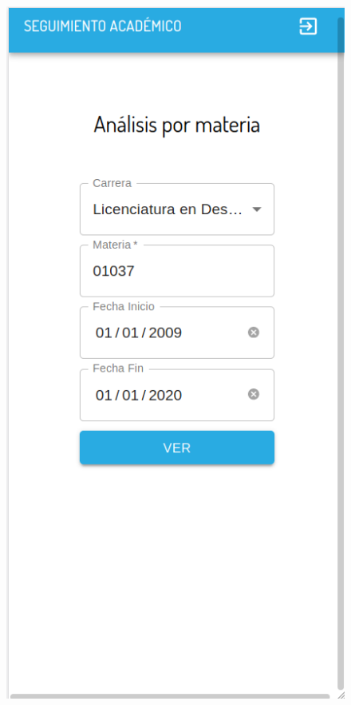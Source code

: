 \begin{figure}[!htbp]
  \centering
    \includegraphics[scale=0.3]{images/seguimiento-academico/sa-mobile-materias-form.png}
  \label{fig:sa-materia-form-mobile}
\end{figure}

